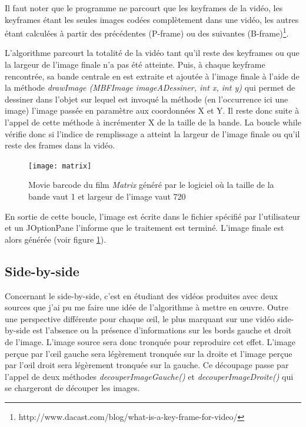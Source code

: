 \documentclass[10pt,a4paper]{article}
\begin{document}
Il faut noter que le  programme ne parcourt que les keyframes de la vidéo, les keyframes étant les seules images codées complètement dans une vidéo, les autres étant calculées à partir des précédentes (P-frame) ou des suivantes (B-frame)\footnote{http://www.dacast.com/blog/what-is-a-key-frame-for-video/}.


L'algorithme parcourt la totalité de la vidéo tant qu'il reste des keyframes ou que la largeur de l'image finale n'a pas été atteinte. Puis, à chaque keyframe rencontrée, sa bande centrale en est extraite et ajoutée à l'image finale à l'aide de la méthode \textit{drawImage (MBFImage imageADessiner, int x, int y)} qui permet de dessiner dans l'objet sur lequel est invoqué la méthode (en l'occurrence ici une image) l'image passée en paramètre aux coordonnées X et Y. Il reste donc suite à l'appel de cette méthode à incrémenter X de la taille de la bande. La boucle while vérifie donc si l'indice de remplissage a atteint la largeur de l'image finale ou qu'il reste des frames dans la vidéo.

\begin{figure}[!h]
\center
\texttt{[image: matrix]}
\caption{Movie barcode du film \textit{Matrix} généré par le logiciel où la taille de la bande vaut 1 et largeur de l'image vaut 720}
\label{matrix}
\end{figure}

En sortie de cette boucle, l'image est écrite dans le fichier spécifié par l'utilisateur et un JOptionPane l'informe que le traitement est terminé. L'image finale est alors générée (voir figure \ref{matrix}).




\subsection{Side-by-side}
\label{decouper}
Concernant le side-by-side, c'est en étudiant des vidéos produites avec deux sources que j'ai pu me faire une idée de l'algorithme à mettre en œuvre. Outre une perspective différente pour chaque œil, le plus marquant sur une vidéo side-by-side est l'absence ou la présence d'informations sur les bords gauche et droit de l'image. L'image source sera donc tronquée pour reproduire cet effet. L'image perçue par l'œil gauche sera légèrement tronquée sur la droite et l'image perçue par l'œil droit sera légèrement tronquée sur la gauche.
Ce découpage passe par l'appel de deux méthodes \textit{decouperImageGauche()} et \textit{decouperImageDroite()} qui se chargeront de découper les images.
\end{document}
